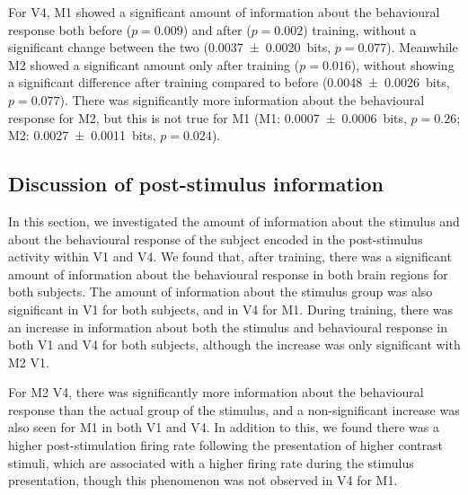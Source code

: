 For \ac{V4}, \ac{M1} showed a significant amount of information about the behavioural response both before ($p=0.009$) and after ($p=0.002$) training, without a significant change between the two (\SI{+0.0037\pm0.0020}{bits}, $p=0.077$).
Meanwhile \ac{M2} showed a significant amount only after training ($p=0.016$), without showing a significant difference after training compared to before (\SI{+0.0048\pm0.0026}{bits}, $p=0.077$).
There was significantly more information about the behavioural response for \ac{M2}, but this is not true for \ac{M1} (\ac{M1}: \SI{+0.0007\pm0.0006}{bits}, $p=0.26$; \ac{M2}: \SI{+0.0027\pm0.0011}{bits}, $p=0.024$).



\subsection{Discussion of post-stimulus information}
\label{sec:pl_poststim_discuss}

In this section, we investigated the amount of information about the stimulus and about the behavioural response of the subject encoded in the post-stimulus activity within \ac{V1} and \ac{V4}.
We found that, after training, there was a significant amount of information about the behavioural response in both brain regions for both subjects.
The amount of information about the stimulus group was also significant in \ac{V1} for both subjects, and in \ac{V4} for \ac{M1}.
During training, there was an increase in information about both the stimulus and behavioural response in both \ac{V1} and \ac{V4} for both subjects, although the increase was only significant with \ac{M2} \ac{V1}.

For \ac{M2} \ac{V4}, there was significantly more information about the behavioural response than the actual group of the stimulus, and a non-significant increase was also seen for \ac{M1} in both \ac{V1} and \ac{V4}.
In addition to this, we found there was a higher post-stimulation firing rate following the presentation of higher contrast stimuli, which are associated with a higher firing rate during the stimulus presentation, though this phenomenon was not observed in \ac{V4} for \ac{M1}.

